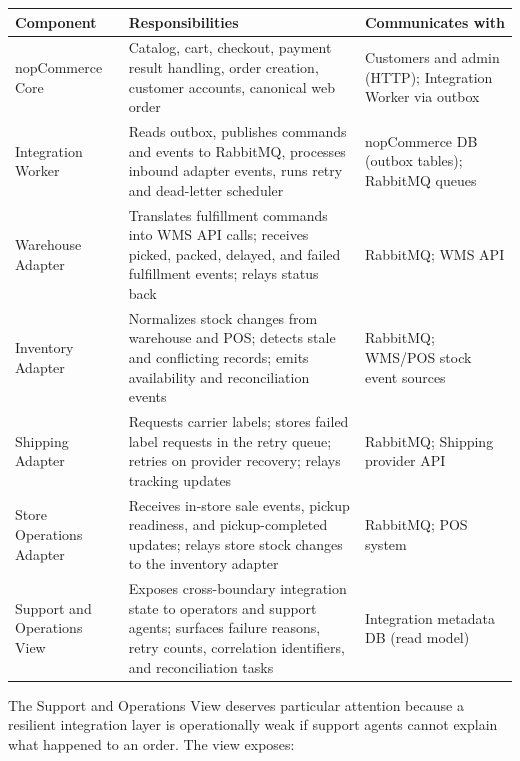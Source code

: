 \begingroup
\small
\setlength{\tabcolsep}{4pt}
\renewcommand{\arraystretch}{1.15}
\begin{center}
\begin{tabular}{|p{}|p{}|p{}|}
\hline
\textbf{Component} & \textbf{Responsibilities} & \textbf{Communicates with} \\
\hline
nopCommerce Core & Catalog, cart, checkout, payment result handling, order creation, customer accounts, canonical web order & Customers and admin (HTTP); Integration Worker via outbox \\
\hline
Integration Worker & Reads outbox, publishes commands and events to RabbitMQ, processes inbound adapter events, runs retry and dead-letter scheduler & nopCommerce DB (outbox tables); RabbitMQ queues \\
\hline
Warehouse Adapter & Translates fulfillment commands into WMS API calls; receives picked, packed, delayed, and failed fulfillment events; relays status back & RabbitMQ; WMS API \\
\hline
Inventory Adapter & Normalizes stock changes from warehouse and POS; detects stale and conflicting records; emits availability and reconciliation events & RabbitMQ; WMS/POS stock event sources \\
\hline
Shipping Adapter & Requests carrier labels; stores failed label requests in the retry queue; retries on provider recovery; relays tracking updates & RabbitMQ; Shipping provider API \\
\hline
Store Operations Adapter & Receives in-store sale events, pickup readiness, and pickup-completed updates; relays store stock changes to the inventory adapter & RabbitMQ; POS system \\
\hline
Support and Operations View & Exposes cross-boundary integration state to operators and support agents; surfaces failure reasons, retry counts, correlation identifiers, and reconciliation tasks & Integration metadata DB (read model) \\
\hline
\end{tabular}
\end{center}
\endgroup

The Support and Operations View deserves particular attention because a resilient integration
layer is operationally weak if support agents cannot explain what happened to an order. The
view exposes:

